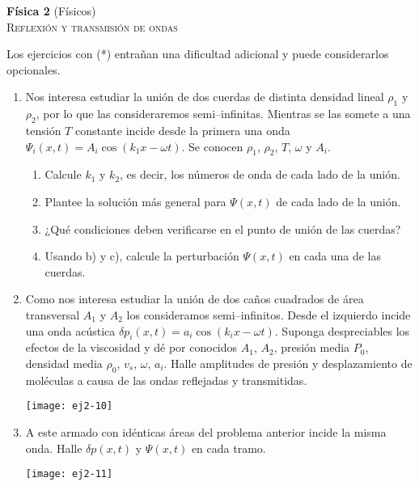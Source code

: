 \documentclass[11pt,spanish,a4paper]{article}
\begin{document}
\begin{center}
\textbf{Física 2} (Físicos) \hfill {}\\
	\textsc{\LARGE Reflexión y transmisión de ondas}
\end{center}

Los ejercicios con (*) entrañan una dificultad adicional y puede considerarlos opcionales.


\begin{enumerate}

\item Nos interesa estudiar la unión de dos cuerdas de distinta densidad lineal $\rho_1$ y $\rho_2$, por lo que las consideraremos semi--infinitas. 
Mientras se las somete a una tensión $T$ constante incide desde la primera una onda $\Psi_i(x,t) = A_i \cos{ \left( k_{1} x- \omega t \right) }$.
Se conocen $\rho_{1}$, $\rho_{2}$, $T$, $\omega$ y $A_{i}$.
\begin{enumerate}
	\item Calcule $k_{1}$ y $k_{2}$, es decir, los números de onda de cada lado de la unión.
	\item Plantee la solución más general para $\Psi(x,t)$ de cada lado de la unión.
	\item ¿Qué condiciones deben verificarse en el punto de unión de las cuerdas?
	\item Usando b) y c), calcule la perturbación $\Psi(x,t)$ en cada una de las cuerdas.
\end{enumerate}


\item
\begin{minipage}[t][3.3cm]{0.6\textwidth}
Como nos interesa estudiar la unión de dos caños cuadrados de área transversal $A_1$ y $A_2$ los consideramos semi--infinitos.
Desde el izquierdo incide una onda acústica $\delta p_i (x,t) = a_i \cos{ \left( k_i x - \omega t \right) }$.
Suponga despreciables los efectos de la viscosidad y dé por conocidos $A_{1}$, $A_{2}$, presión media $P_{0}$, densidad media $\rho_{0}$, $v_{s}$, $\omega$, $a_i$.
Halle amplitudes de presión y desplazamiento de moléculas a causa de las ondas reflejadas y transmitidas.
\end{minipage}
\begin{minipage}[c][0cm][t]{0.34\textwidth}
	\texttt{[image: ej2-10]}
\end{minipage}


\item 
\begin{minipage}[t][1.6cm]{0.6\textwidth}
A este armado con idénticas áreas del problema anterior incide la misma onda.
Halle $\delta p(x,t)$ y $\Psi(x,t)$ en cada tramo.
\end{minipage}
\begin{minipage}[c][1cm][t]{0.34\textwidth}
	\texttt{[image: ej2-11]}
\end{minipage}



\end{enumerate}
\end{document}
